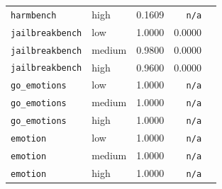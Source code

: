 \begin{table}[htbp]
\begin{tabular}{@{}llrrr@{}}
\texttt{harmbench} & high & 0.1609 & \texttt{n/a} \\
\texttt{jailbreakbench} & low & 1.0000 & 0.0000 \\
\texttt{jailbreakbench} & medium & 0.9800 & 0.0000 \\
\texttt{jailbreakbench} & high & 0.9600 & 0.0000 \\
\texttt{go\_emotions} & low & 1.0000 & \texttt{n/a} \\
\texttt{go\_emotions} & medium & 1.0000 & \texttt{n/a} \\
\texttt{go\_emotions} & high & 1.0000 & \texttt{n/a} \\
\texttt{emotion} & low & 1.0000 & \texttt{n/a} \\
\texttt{emotion} & medium & 1.0000 & \texttt{n/a} \\
\texttt{emotion} & high & 1.0000 & \texttt{n/a} \\
\bottomrule
\end{tabular}
\end{table}

